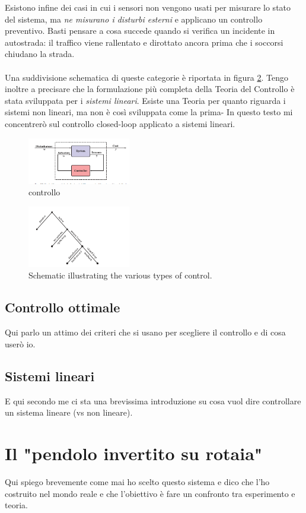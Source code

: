Esistono infine dei casi in cui i sensori non vengono usati per misurare
lo stato del sistema, ma \emph{ne misurano i disturbi esterni} e applicano un
controllo preventivo. Basti pensare a cosa succede quando si verifica un incidente
in autostrada: il traffico viene rallentato e dirottato ancora prima che i soccorsi
chiudano la strada.

\paragraph{}
Una suddivisione schematica di queste categorie è riportata in figura \ref{fig:control-types}.
Tengo inoltre a precisare che la formulazione più completa della Teoria del Controllo
è stata sviluppata per i \emph{sistemi lineari}. Esiste una Teoria per quanto riguarda
i sistemi non lineari, ma non è così sviluppata come la prima-
In questo testo mi concentrerò sul controllo closed-loop applicato a sistemi lineari.

\begin{figure}[thb]
    \centering
    \includegraphics[width=0.4\textwidth]{assets/open-vs-closed.png}
    \caption{controllo }%
    \label{fig:open-vs-closed}
\end{figure}


\begin{figure}[thb]
    \centering
    \includegraphics[width=0.4\textwidth]{assets/control-types.png}
    \caption{Schematic illustrating the various types of control.} %
    \label{fig:control-types}
\end{figure}

\subsection{Controllo ottimale}
\label{subsec:controllo-ottimale}
Qui parlo un attimo dei criteri che si usano per scegliere il controllo e di
cosa userò io.

\subsection{Sistemi lineari}
E qui secondo me ci sta una brevissima introduzione su cosa vuol dire
controllare un sistema lineare (vs non lineare).

\section{Il "pendolo invertito su rotaia"}
Qui spiego brevemente come mai ho scelto questo sistema e dico che l'ho costruito nel mondo reale  e che l'obiettivo è fare un confronto tra esperimento e teoria.